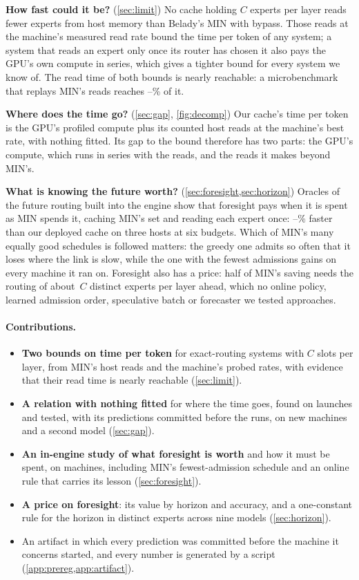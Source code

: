 \textbf{How fast could it be?} (\cref{sec:limit}) No cache holding $C$ experts per layer reads fewer experts from host
memory than Belady's MIN with bypass. Those reads at the machine's measured read rate bound the time per token of any
system; a system that reads an expert only once its router has chosen it also pays the GPU's own compute in series,
which gives a tighter bound for every system we know of. The read time of both bounds is nearly reachable: a
microbenchmark that replays MIN's reads reaches \jdLayerMin--\jdLayerMax\% of it.

\textbf{Where does the time go?} (\cref{sec:gap}, \cref{fig:decomp}) Our cache's time per token is the GPU's profiled
compute plus its counted host reads at the machine's best rate, with nothing fitted. %
Its gap to the bound therefore has two parts: the GPU's compute, which runs in series with the reads, and the reads it
makes beyond MIN's.

\textbf{What is knowing the future worth?} (\cref{sec:foresight,sec:horizon}) Oracles of the future routing built into the
engine show that foresight pays when it is spent as MIN spends it, caching MIN's set and reading each expert once:
\fxFetchAllGainMin--\fxFetchAllGainMax\% faster than our deployed cache on three hosts at six budgets. Which of MIN's
many equally good schedules is followed matters: the greedy one admits so often that it loses where the link is slow,
while the one with the fewest admissions gains on every machine it ran on. %
Foresight also has a price: half of MIN's saving needs the routing of about \dcMed$\,C$ distinct experts per layer
ahead, which no online policy, learned admission order, speculative batch or forecaster we tested approaches.

\paragraph{Contributions.}
\begin{itemize}\setlength\itemsep{1pt}
\item \textbf{Two bounds on time per token} for exact-routing systems with $C$ slots per layer, from MIN's host reads
and the machine's probed rates, with evidence that their read time is nearly reachable (\cref{sec:limit}).
\item \textbf{A relation with nothing fitted} for where the time goes, found on \slLaunches{} launches and tested, with
its predictions committed before the runs, on new machines and a second model (\cref{sec:gap}).
\item \textbf{An in-engine study of what foresight is worth} and how it must be spent, on \slAllMachines{} machines,
including MIN's fewest-admission schedule and an online rule that carries its lesson (\cref{sec:foresight}).
\item \textbf{A price on foresight}: its value by horizon and accuracy, and a one-constant rule for the horizon in
distinct experts across nine models (\cref{sec:horizon}).
\item An artifact in which every prediction was committed before the machine it concerns started, and every number is
generated by a script (\cref{app:prereg,app:artifact}).
\end{itemize}


